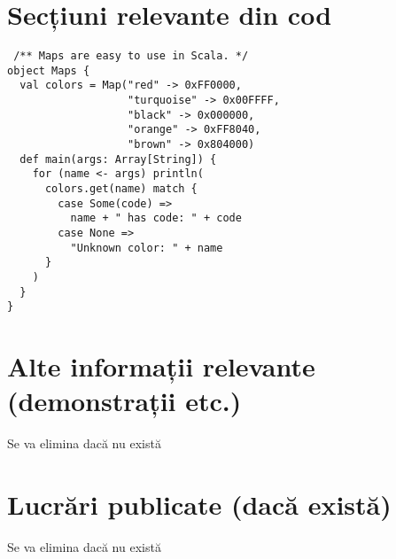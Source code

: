 \appendix
\chapter{Secțiuni relevante din cod}
\pagestyle{fancy}

\begin{verbatim}
 /** Maps are easy to use in Scala. */
object Maps {
  val colors = Map("red" -> 0xFF0000,
                   "turquoise" -> 0x00FFFF,
                   "black" -> 0x000000,
                   "orange" -> 0xFF8040,
                   "brown" -> 0x804000)
  def main(args: Array[String]) {
    for (name <- args) println(
      colors.get(name) match {
        case Some(code) =>
          name + " has code: " + code
        case None =>
          "Unknown color: " + name
      }
    )
  }
}
\end{verbatim}

\chapter{Alte informații relevante (demonstrații etc.)}

{\color{blue}Se va elimina dacă nu există}

\chapter{Lucrări publicate (dacă există)}

{\color{blue}Se va elimina dacă nu există}